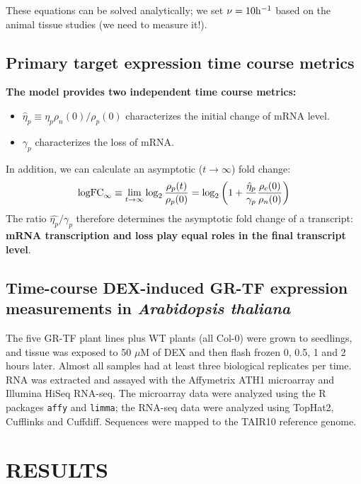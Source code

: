 \documentclass[aspb,landscape]{a0poster}
\begin{document}
\begin{multicols}{4}
  These equations can be solved analytically; we set $\nu=10 {\rm h}^{-1}$ based on the animal tissue studies (we need to measure it!).
  
  \subsection*{Primary target expression time course metrics}
  
  \textbf{The model provides two independent time course metrics:}
  \begin{itemize}
  \item $\hat{\eta}_p  \equiv \eta_p \rho_n(0) / \rho_p(0)$ characterizes the initial change of mRNA level.
  \item $\gamma_p$ characterizes the loss of mRNA.
  \end{itemize}
  In addition, we can calculate an asymptotic ($t\rightarrow\infty$) fold change:
  \begin{equation*}
    {\rm logFC}_\infty \equiv \lim_{t \to \infty} \log_2\frac{\rho_p(t)}{\rho_p(0)} = \log_2\left(1 + \frac{\hat{\eta}_p}{\gamma_p} \frac{\rho_c(0)}{\rho_n(0)} \right)
  \end{equation*}
  The ratio $\hat{\eta_p}/\gamma_p$ therefore determines the asymptotic fold change of a transcript: \textbf{mRNA transcription and loss play equal roles in the final transcript level}.

  \subsection*{Time-course DEX-induced GR-TF expression measurements in {\it Arabidopsis thaliana}}
  
  The five GR-TF plant lines plus WT plants (all Col-0) were grown to seedlings, and tissue was exposed to 50 $\mu$M of DEX and then flash frozen 0, 0.5, 1 and 2 hours later.
  Almost all samples had at least three biological replicates per time. RNA was extracted and assayed with the Affymetrix ATH1 microarray and Illumina HiSeq RNA-seq.
  The microarray data were analyzed using the R packages \texttt{affy} and \texttt{limma}; the RNA-seq data were analyzed using TopHat2, Cufflinks and Cuffdiff.
  Sequences were mapped to the TAIR10 reference genome.


  \section*{RESULTS}


\end{multicols}
\end{document}
